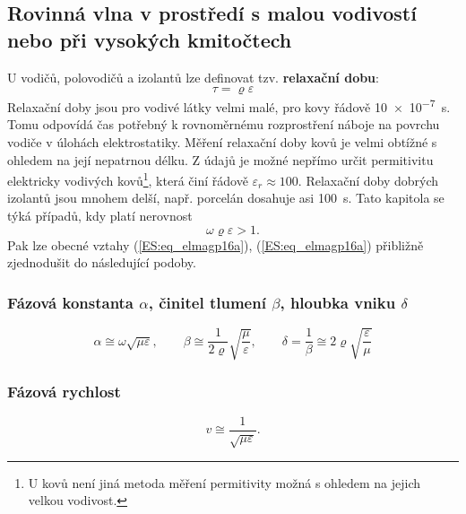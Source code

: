     \subsection{Rovinná vlna v prostředí s malou vodivostí nebo při vysokých kmitočtech}
      U vodičů, polovodičů a izolantů lze definovat tzv. \textbf{relaxační dobu}:
      \begin{equation}\label{ES:eq_elmagp42}
        \tau = \varrho\varepsilon
      \end{equation}
      Relaxační doby jsou pro vodivé látky velmi malé, pro kovy řádově \qty{10e-7}{\s}. Tomu 
      odpovídá čas potřebný k rovnoměrnému rozprostření náboje na povrchu vodiče v úlohách 
      elektrostatiky. Měření relaxační doby kovů je velmi obtížné s ohledem na její nepatrnou 
      délku. Z údajů je možné nepřímo určit permitivitu elektricky vodivých kovů\footnote{U 
      kovů není jiná metoda měření permitivity možná s ohledem na jejich velkou vodivost.}, která 
      činí řádově \(\varepsilon_r \approx 100\). Relaxační doby dobrých izolantů jsou mnohem delší, 
      např. porcelán dosahuje asi \qty{100}{\s}. Tato kapitola se týká případů, kdy platí nerovnost
      \begin{equation}\label{ES:eq_elmagp43}
        \omega\varrho\varepsilon > 1.
      \end{equation}
      Pak lze obecné vztahy (\ref{ES:eq_elmagp16a}), (\ref{ES:eq_elmagp16a}) přibližně zjednodušit 
      do následující podoby.

    \subsubsection{Fázová konstanta \(\alpha\), činitel tlumení \(\beta\), hloubka vniku 
                     \(\delta\)}
       \begin{equation}\label{ES:eq_elmagp44}
         \alpha \cong \omega\sqrt{\mu\varepsilon}, \qquad
         \beta  \cong \frac{1}{2\varrho}\sqrt{\frac{\mu}{\varepsilon}}, \qquad
         \delta = \frac{1}{\beta}\cong2\varrho\sqrt{\frac{\varepsilon}{\mu}}
       \end{equation}

    \subsubsection{Fázová rychlost}
    \begin{equation}\label{ES:eq_elmagp45}
      v \cong \frac{1}{\sqrt{\mu\varepsilon}}.
    \end{equation}
    
